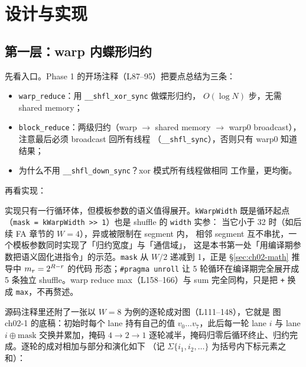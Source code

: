 \section{设计与实现}

\subsection{第一层：warp 内蝶形归约}\label{sec:ch02-warp}

先看入口。Phase 1 的开场注释（L87--95）把要点总结为三条：

\begin{itemize}
\item \texttt{warp\_reduce}：用 \texttt{\_\_shfl\_xor\_sync} 做蝶形归约，
  $O(\log N)$ 步，无需 shared memory；
\item \texttt{block\_reduce}：两级归约（warp $\to$ shared memory $\to$
  warp0 broadcast），注意最后必须 broadcast 回所有线程
  （\texttt{\_\_shfl\_sync}），否则只有 warp0 知道结果；
\item 为什么不用 \texttt{\_\_shfl\_down\_sync}？xor 模式所有线程做相同
  工作量，更均衡。
\end{itemize}

再看实现：



实现只有一行循环体，但模板参数的语义值得展开。\texttt{kWarpWidth} 既是循环起点
（\texttt{mask = kWarpWidth >> 1}）也是 shuffle 的 \texttt{width} 实参：
当它小于 32 时（如后续 FA 章节的 $W = 4$），异或被限制在 segment 内，
相邻 segment 互不串扰，一个模板参数同时实现了「归约宽度」与「通信域」，
这是本书第一处「用编译期参数把语义固化进指令」的示范。\texttt{mask} 从
$W/2$ 递减到 1，正是 \S\ref{sec:ch02-math} 推导中 $m\sb r = 2^{R-r}$ 的代码
形态；\texttt{\#pragma unroll} 让 5 轮循环在编译期完全展开成 5 条独立
shuffle。warp reduce max（L158--166）与 sum 完全同构，只是把 \texttt{+}
换成 \texttt{max}，不再赘述。

源码注释里还附了一张以 $W=8$ 为例的逐轮成对图（L111--148），它就是
图 ch02-1 的底稿：初始时每个 lane 持有自己的值 $v_0 \dots v_7$，此后每一轮
lane $i$ 与 lane $i \oplus \mathrm{mask}$ 交换并累加，掩码 $4 \to 2 \to 1$
逐轮减半，掩码归零后循环终止、归约完成。逐轮的成对相加与部分和演化如下
（记 $\Sigma\{i_1, i_2, \dots\}$ 为括号内下标元素之和）：

